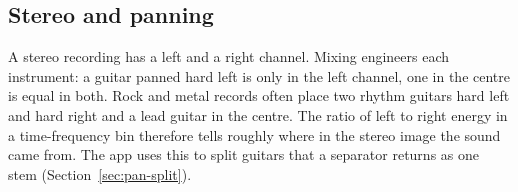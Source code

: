 \subsection{Stereo and panning}

A stereo recording has a left and a right channel. Mixing engineers
 each instrument: a guitar panned hard left is only in the left
channel, one in the centre is equal in both. Rock and metal records often place
two rhythm guitars hard left and hard right and a lead guitar in the centre. The
ratio of left to right energy in a time-frequency bin therefore tells roughly
where in the stereo image the sound came from. The app uses this to split
guitars that a separator returns as one stem (Section~\ref{sec:pan-split}).
